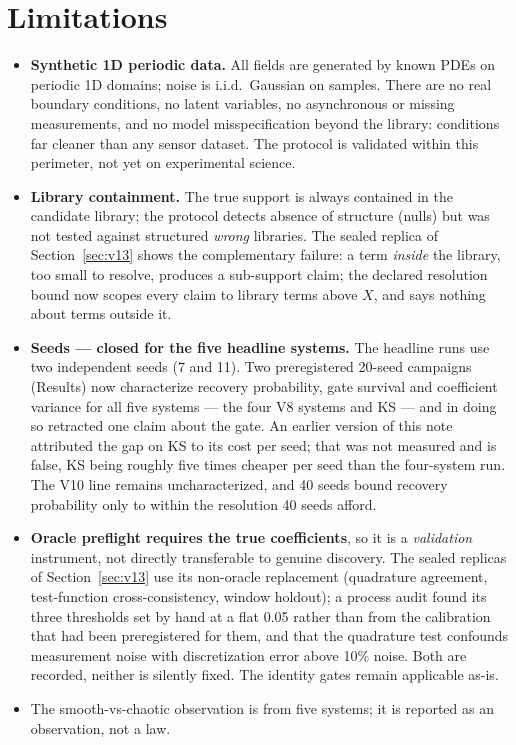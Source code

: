 \documentclass[11pt]{article}
\begin{document}
\section{Limitations}
\begin{itemize}
\item \textbf{Synthetic 1D periodic data.} All fields are generated by known
PDEs on periodic 1D domains; noise is i.i.d.\ Gaussian on samples. There are
no real boundary conditions, no latent variables, no asynchronous or missing
measurements, and no model misspecification beyond the library: conditions
far cleaner than any sensor dataset. The protocol is validated within this
perimeter, not yet on experimental science.
\item \textbf{Library containment.} The true support is always contained in
the candidate library; the protocol detects absence of structure (nulls) but
was not tested against structured \emph{wrong} libraries. The sealed replica
of Section~\ref{sec:v13} shows the complementary failure: a term \emph{inside}
the library, too small to resolve, produces a sub-support claim; the declared
resolution bound now scopes every claim to library terms above $X$, and says
nothing about terms outside it.
\item \textbf{Seeds --- closed for the five headline systems.} The
headline runs use two independent seeds (7 and 11). Two preregistered 20-seed campaigns
(Results) now characterize recovery probability, gate survival and
coefficient variance for all five systems --- the four V8 systems and
KS --- and in doing so retracted one claim about the gate. An earlier
version of this note attributed the gap on KS to its cost per seed; that
was not measured and is false, KS being roughly five times cheaper per
seed than the four-system run. The V10 line remains uncharacterized, and
40 seeds bound recovery probability only to within the resolution 40
seeds afford.
\item \textbf{Oracle preflight requires the true coefficients}, so it is a
\emph{validation} instrument, not directly transferable to genuine
discovery. The sealed replicas of Section~\ref{sec:v13} use its non-oracle
replacement (quadrature agreement, test-function cross-consistency, window
holdout); a process audit found its three thresholds set by hand at a flat
0.05 rather than from the calibration that had been preregistered for them,
and that the quadrature test confounds measurement noise with discretization
error above 10\% noise. Both are recorded, neither is silently fixed. The
identity gates remain applicable as-is.
\item The smooth-vs-chaotic observation is from five systems; it is reported
as an observation, not a law.
\end{itemize}
\end{document}
